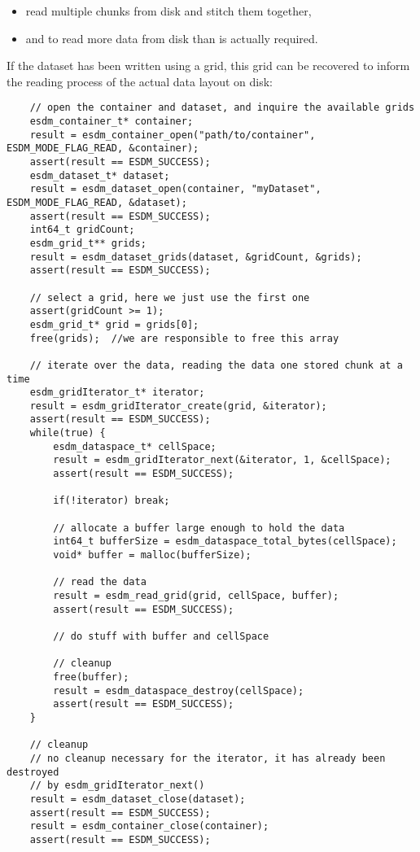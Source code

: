 \begin{itemize}
  \item read multiple chunks from disk and stitch them together,
  \item and to read more data from disk than is actually required.
\end{itemize}

If the dataset has been written using a grid, this grid can be recovered to inform the reading process of the actual data layout on disk:

\begin{lstlisting}
    // open the container and dataset, and inquire the available grids
    esdm_container_t* container;
    result = esdm_container_open("path/to/container", ESDM_MODE_FLAG_READ, &container);
    assert(result == ESDM_SUCCESS);
    esdm_dataset_t* dataset;
    result = esdm_dataset_open(container, "myDataset", ESDM_MODE_FLAG_READ, &dataset);
    assert(result == ESDM_SUCCESS);
    int64_t gridCount;
    esdm_grid_t** grids;
    result = esdm_dataset_grids(dataset, &gridCount, &grids);
    assert(result == ESDM_SUCCESS);

    // select a grid, here we just use the first one
    assert(gridCount >= 1);
    esdm_grid_t* grid = grids[0];
    free(grids);  //we are responsible to free this array

    // iterate over the data, reading the data one stored chunk at a time
    esdm_gridIterator_t* iterator;
    result = esdm_gridIterator_create(grid, &iterator);
    assert(result == ESDM_SUCCESS);
    while(true) {
        esdm_dataspace_t* cellSpace;
        result = esdm_gridIterator_next(&iterator, 1, &cellSpace);
        assert(result == ESDM_SUCCESS);

        if(!iterator) break;

        // allocate a buffer large enough to hold the data
        int64_t bufferSize = esdm_dataspace_total_bytes(cellSpace);
        void* buffer = malloc(bufferSize);

        // read the data
        result = esdm_read_grid(grid, cellSpace, buffer);
        assert(result == ESDM_SUCCESS);

        // do stuff with buffer and cellSpace

        // cleanup
        free(buffer);
        result = esdm_dataspace_destroy(cellSpace);
        assert(result == ESDM_SUCCESS);
    }

    // cleanup
    // no cleanup necessary for the iterator, it has already been destroyed 
    // by esdm_gridIterator_next()
    result = esdm_dataset_close(dataset);
    assert(result == ESDM_SUCCESS);
    result = esdm_container_close(container);
    assert(result == ESDM_SUCCESS);
\end{lstlisting}
